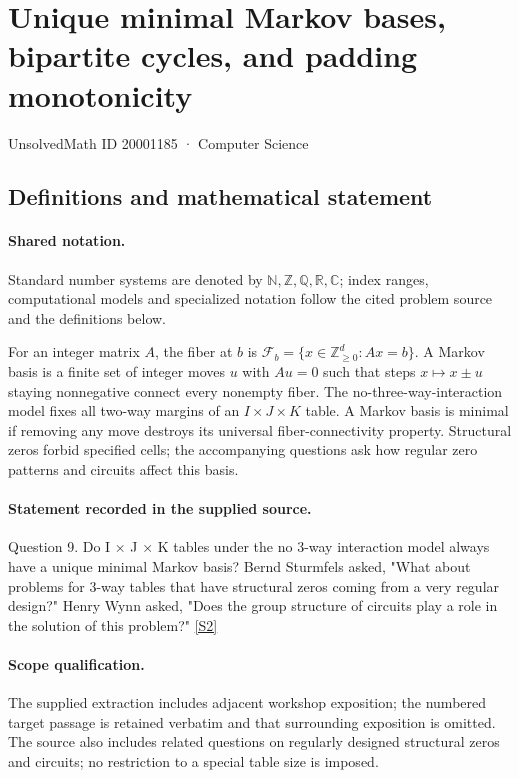 \documentclass[11pt]{article}
\newcommand{\sref}[2]{\hyperlink{source:#1:#2}{[S#2]}}
\begin{document}
\setcounter{section}{20001184}
\section{Unique minimal Markov bases, bipartite cycles, and padding monotonicity}\label{20001185}
{\small\sffamily UnsolvedMath ID 20001185 · Computer Science}
\subsection{Definitions and mathematical statement}

\paragraph{Shared notation.}Standard number systems are denoted by $\mathbb N,\mathbb Z,\mathbb Q,\mathbb R,\mathbb C$; index ranges, computational models and specialized notation follow the cited problem source and the definitions below.


For an integer matrix $A$, the fiber at $b$ is $\mathcal F_b=\{x\in\mathbb Z_{\ge0}^d:Ax=b\}$. A Markov basis is a finite set of integer moves $u$ with $Au=0$ such that steps $x\mapsto x\pm u$ staying nonnegative connect every nonempty fiber. The no-three-way-interaction model fixes all two-way margins of an $I\times J\times K$ table. A Markov basis is minimal if removing any move destroys its universal fiber-connectivity property. Structural zeros forbid specified cells; the accompanying questions ask how regular zero patterns and circuits affect this basis.
\paragraph{Statement recorded in the supplied source.}
Question 9. Do I × J × K tables under the no 3-way interaction model always have a unique minimal Markov basis? Bernd Sturmfels asked, "What about problems for 3-way tables that have structural zeros coming from a very regular design?" Henry Wynn asked, "Does the group structure of circuits play a role in the solution of this problem?" \sref{20001185}{2}
\paragraph{Scope qualification.}
The supplied extraction includes adjacent workshop exposition; the numbered target passage is retained verbatim and that surrounding exposition is omitted. The source also includes related questions on regularly designed structural zeros and circuits; no restriction to a special table size is imposed.
\end{document}
